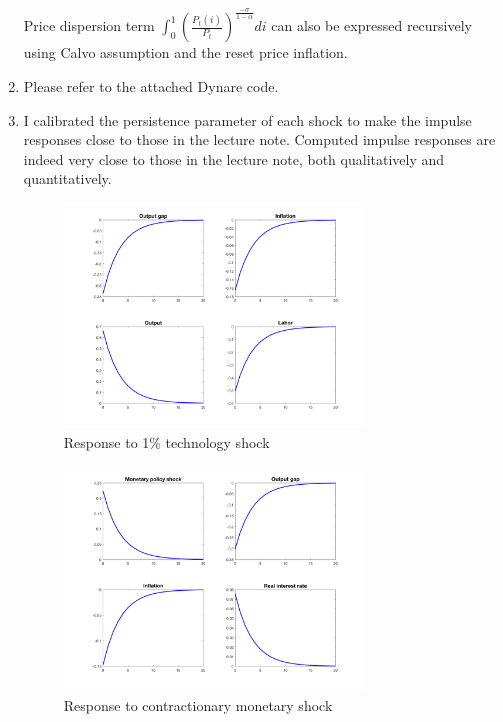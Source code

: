 \documentclass[11pt]{amsart}
\begin{document}
\begin{enumerate}[label = (\alph*)]
	Price dispersion term $\int _ { 0} ^ { 1} \left( \frac { P _ { t } ( i ) } { P _ { t } } \right) ^ { \frac { - \sigma } { 1- \alpha } } d i$ can also be expressed recursively using Calvo assumption and the reset price inflation. 
	\item Please refer to the attached Dynare code. 
	\item I calibrated the persistence parameter of each shock to make the impulse responses close to those in the lecture note. Computed impulse responses are indeed very close to those in the lecture note, both qualitatively and quantitatively.
	\begin{figure}[H]
		\centering
		\includegraphics[width=0.75\textwidth]{techshock}
		\caption{Response to 1\% technology shock}
	\end{figure}

    \begin{figure}[H]
    	\centering
    	\includegraphics[width=0.75\textwidth]{monetaryshock}
    	\caption{Response to contractionary monetary shock}
    \end{figure}  
\end{enumerate}
\end{document}
